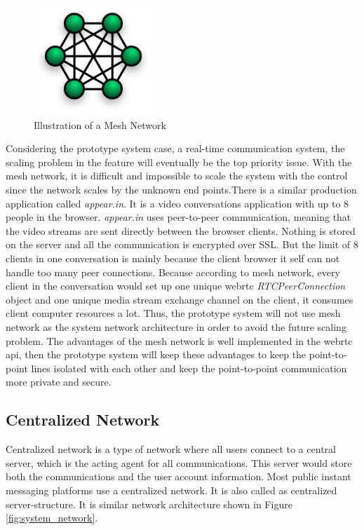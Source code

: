 \begin{figure}
	\centering
    	\includegraphics[width=0.40\textwidth,natwidth=610,natheight=642]{figs/mesh_network.png}
  	\caption{Illustration of a Mesh Network \cite{wiki:mesh_network}}
  	\label{fig:mesh_network}
\end{figure}

\par Considering the prototype system case, a real-time communication system, the scaling problem in the feature will eventually be the top priority issue. With the mesh network, it is difficult and impossible to scale the system with the control since the network scales by the unknown end points.There is a similar production application called \textit{appear.in}. It is a video conversations application with up to 8 people in the browser. \textit{appear.in} uses peer-to-peer communication, meaning that the video streams are sent directly between the browser clients. Nothing is stored on the server and all the communication is encrypted over SSL. But the limit of 8 clients in one conversation is mainly because the client browser it self can not handle too many peer connections. Because according to mesh network, every client in the conversation would set up one unique \gls{webrtc} \textit{RTCPeerConnection} object and one unique media stream exchange channel on the client, it consumes client computer resources a lot. Thus, the prototype system will not use mesh network as the system network architecture in order to avoid the future scaling problem. The advantages of the mesh network is well implemented in the \gls{webrtc} api, then the prototype system will keep these advantages to keep the point-to-point lines isolated with each other and keep the point-to-point communication more private and secure.

\subsection{Centralized Network}

\par Centralized network is a type of network where all users connect to a central server, which is the acting agent for all communications. This server would store both the communications and the user account information. Most public instant messaging platforms use a centralized network. It is also called as centralized server-structure.\cite{webopedia:centralized_network} It is similar network architecture shown in Figure \ref{fig:system_network}.


